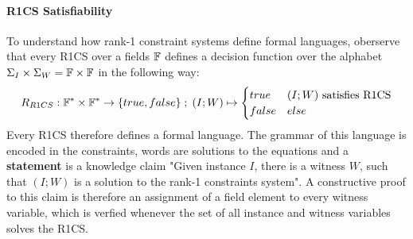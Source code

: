 \paragraph{R1CS Satisfiability}To understand how rank-1 constraint systems define formal languages, oberserve that every R1CS over a fields $\mathbb{F}$ defines a decision function over the alphabet $\Sigma_I \times \Sigma_W = \mathbb{F} \times \mathbb{F}$ in the following way:
\begin{equation}
R_{R1CS} : \mathbb{F}^* \times \mathbb{F}^* \to \{true, false\}\;;\;
(I;W) \mapsto
\begin{cases}
true & (I;W) \text{ satisfies R1CS}\\
false & else
\end{cases}
\end{equation}
Every R1CS therefore defines a formal language. The grammar of this language is encoded in the constraints, words are solutions to the equations and  a \textbf{statement} is a knowledge claim "Given instance $I$, there is a witness $W$, such that $(I;W)$ is a solution to the rank-1 constraints system". A constructive proof to this claim is therefore an assignment of a field element to every witness variable, which is verfied whenever the set of all instance and witness variables solves the R1CS. 

